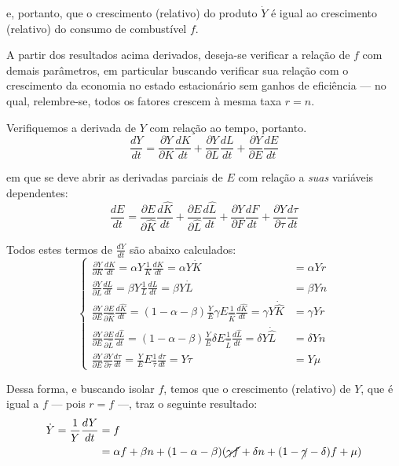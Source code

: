 e, portanto, que o crescimento (relativo) do produto $\dot{Y}$ é igual ao crescimento (relativo) do consumo de combustível $f$.

A partir dos resultados acima derivados, deseja-se verificar a relação de $f$ com demais parâmetros, em particular buscando verificar sua relação com o crescimento da economia no estado estacionário sem ganhos de eficiência — no qual, relembre-se, todos os fatores crescem à mesma taxa $r=n$. 

Verifiquemos a derivada de $Y$ com relação ao tempo, portanto.
$$
\frac{dY}{dt} = \frac{ \partial Y }{ \partial K } \frac{dK}{dt} + \frac{ \partial Y }{ \partial L } \frac{dL}{dt} + \frac{ \partial Y }{ \partial E } \frac{dE}{dt} 
$$

em que se deve abrir as derivadas parciais de $E$ com relação a \textit{suas} variáveis dependentes:
$$
\frac{dE}{dt} = \frac{ \partial E }{ \partial \hat{K} } \frac{d \hat{K}}{dt} + \frac{ \partial E }{ \partial \hat{L} } \frac{d\hat{L}}{dt} + \frac{ \partial Y }{ \partial F } \frac{dF}{dt} + \frac{ \partial Y }{ \partial \tau } \frac{d\tau}{dt}
$$

Todos estes termos de $\frac{dY}{dt}$ são abaixo calculados:
$$
\begin{cases}
\frac{ \partial Y }{ \partial K } \frac{dK}{dt} = \alpha Y \frac{1}{K} \frac{dK}{dt} = \alpha Y \dot{K} &= \alpha Yr\\
\frac{ \partial Y }{ \partial L } \frac{dL}{dt} = \beta Y \frac{1}{L} \frac{dL}{dt} = \beta Y \dot{L} &= \beta Y n\\
 \frac{ \partial Y }{ \partial E }\frac{ \partial E }{ \partial \hat{K} } \frac{d \hat{K}}{dt} = (1-\alpha-\beta) \frac{Y}{E} \gamma E \frac{1}{\hat{K}} \frac{d\hat{K}}{dt} = \gamma Y\dot{\hat{K}} &= \gamma Y r \\
  \frac{ \partial Y }{ \partial E }\frac{ \partial E }{ \partial \hat{L} } \frac{d \hat{L}}{dt} = (1-\alpha-\beta) \frac{Y}{E} \delta E \frac{1}{\hat{L}} \frac{d\hat{L}}{dt} = \delta Y \dot{\hat{L}} &= \delta Yn \\
  \frac{ \partial Y }{ \partial E }\frac{ \partial Y }{ \partial \tau } \frac{d\tau}{dt} = \frac{Y}{E} E \frac{1}{\tau} \frac{d\tau}{dt} = Y \dot{\tau} &= Y \mu
\end{cases}
$$

Dessa forma, e buscando isolar $f$, temos que o crescimento (relativo) de $Y$, que é igual a $f$ — pois $r=f$ —, traz o seguinte resultado:
\begin{align*}
\dot{Y} = \frac{1}{Y} \frac{dY}{dt} &= f\\
&= \alpha f + \beta n + (1-\alpha-\beta) (\cancel{ \gamma f } + \delta n + (1-\cancel{ \gamma }-\delta) f + \mu)
\end{align*}

